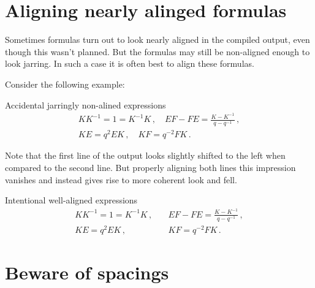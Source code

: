\section{Aligning nearly alinged formulas}

Sometimes formulas turn out to look nearly aligned in the compiled output, even though this wasn’t planned.
But the formulas may still be non-aligned enough to look jarring.
In such a case it is often best to align these formulas.

Consider the following example:
\begin{showlatex}{Accidental jarringly non-alined expressions}
\begin{gather*}
  KK^{-1} = 1 = K^{-1}K \,,
  \quad
  EF - FE = \frac{ K - K^{-1} }{ q - q^{-1} } \,,
  \\
  KE = q^2 EK \,,
  \quad
  KF = q^{-2} FK \,.
\end{gather*}
\end{showlatex}
Note that the first line of the output looks slightly shifted to the left when compared to the second line.
But properly aligning both lines this impression vanishes and instead gives rise to more coherent look and fell.
\begin{showlatex}{Intentional well-aligned expressions}
\begin{align*}
  KK^{-1} = 1 = K^{-1}K \,,
  \quad
  &EF - FE = \frac{ K - K^{-1} }{ q - q^{-1} } \,,
  \\
  KE = q^2 EK \,,
  \quad
  &KF = q^{-2} FK \,.
\end{align*}
\end{showlatex}





\section{Beware of spacings}

